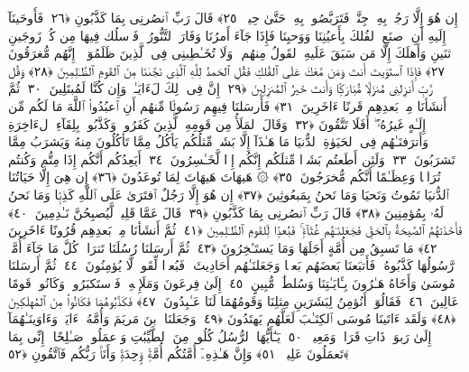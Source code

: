  إِن هُوَ إِلَّا رَجُلٌۢ بِهِۦ جِنَّةٌۭ فَتَرَبَّصُوا۟ بِهِۦ حَتَّىٰ حِينٍۢ ﴿٢٥﴾
 قَالَ رَبِّ ٱنصُرنِى بِمَا كَذَّبُونِ ﴿٢٦﴾
 فَأَوحَينَآ إِلَيهِ أَنِ ٱصنَعِ ٱلفُلكَ بِأَعيُنِنَا وَوَحيِنَا فَإِذَا جَآءَ أَمرُنَا وَفَارَ ٱلتَّنُّورُ ۙ فَٱسلُك فِيهَا مِن كُلٍّۢ زَوجَينِ ٱثنَينِ وَأَهلَكَ إِلَّا مَن سَبَقَ عَلَيهِ ٱلقَولُ مِنهُم ۖ وَلَا تُخَـٰطِبنِى فِى ٱلَّذِينَ ظَلَمُوٓا۟ ۖ إِنَّهُم مُّغرَقُونَ ﴿٢٧﴾
 فَإِذَا ٱستَوَيتَ أَنتَ وَمَن مَّعَكَ عَلَى ٱلفُلكِ فَقُلِ ٱلحَمدُ لِلَّهِ ٱلَّذِى نَجَّىٰنَا مِنَ ٱلقَومِ ٱلظَّـٰلِمِينَ ﴿٢٨﴾
 وَقُل رَّبِّ أَنزِلنِى مُنزَلًۭا مُّبَارَكًۭا وَأَنتَ خَيرُ ٱلمُنزِلِينَ ﴿٢٩﴾
 إِنَّ فِى ذَٟلِكَ لَءَايَـٰتٍۢ وَإِن كُنَّا لَمُبتَلِينَ ﴿٣٠﴾
 ثُمَّ أَنشَأنَا مِنۢ بَعدِهِم قَرنًا ءَاخَرِينَ ﴿٣١﴾
 فَأَرسَلنَا فِيهِم رَسُولًۭا مِّنهُم أَنِ ٱعبُدُوا۟ ٱللَّهَ مَا لَكُم مِّن إِلَـٰهٍ غَيرُهُۥٓ ۖ أَفَلَا تَتَّقُونَ ﴿٣٢﴾
 وَقَالَ ٱلمَلَأُ مِن قَومِهِ ٱلَّذِينَ كَفَرُوا۟ وَكَذَّبُوا۟ بِلِقَآءِ ٱلءَاخِرَةِ وَأَترَفنَـٰهُم فِى ٱلحَيَوٰةِ ٱلدُّنيَا مَا هَـٰذَآ إِلَّا بَشَرٌۭ مِّثلُكُم يَأكُلُ مِمَّا تَأكُلُونَ مِنهُ وَيَشرَبُ مِمَّا تَشرَبُونَ ﴿٣٣﴾
 وَلَئِن أَطَعتُم بَشَرًۭا مِّثلَكُم إِنَّكُم إِذًۭا لَّخَـٰسِرُونَ ﴿٣٤﴾
 أَيَعِدُكُم أَنَّكُم إِذَا مِتُّم وَكُنتُم تُرَابًۭا وَعِظَـٰمًا أَنَّكُم مُّخرَجُونَ ﴿٣٥﴾
 ۞ هَيهَاتَ هَيهَاتَ لِمَا تُوعَدُونَ ﴿٣٦﴾
 إِن هِىَ إِلَّا حَيَاتُنَا ٱلدُّنيَا نَمُوتُ وَنَحيَا وَمَا نَحنُ بِمَبعُوثِينَ ﴿٣٧﴾
 إِن هُوَ إِلَّا رَجُلٌ ٱفتَرَىٰ عَلَى ٱللَّهِ كَذِبًۭا وَمَا نَحنُ لَهُۥ بِمُؤمِنِينَ ﴿٣٨﴾
 قَالَ رَبِّ ٱنصُرنِى بِمَا كَذَّبُونِ ﴿٣٩﴾
 قَالَ عَمَّا قَلِيلٍۢ لَّيُصبِحُنَّ نَـٰدِمِينَ ﴿٤٠﴾
 فَأَخَذَتهُمُ ٱلصَّيحَةُ بِٱلحَقِّ فَجَعَلنَـٰهُم غُثَآءًۭ ۚ فَبُعدًۭا لِّلقَومِ ٱلظَّـٰلِمِينَ ﴿٤١﴾
 ثُمَّ أَنشَأنَا مِنۢ بَعدِهِم قُرُونًا ءَاخَرِينَ ﴿٤٢﴾
 مَا تَسبِقُ مِن أُمَّةٍ أَجَلَهَا وَمَا يَستَـٔخِرُونَ ﴿٤٣﴾
 ثُمَّ أَرسَلنَا رُسُلَنَا تَترَا ۖ كُلَّ مَا جَآءَ أُمَّةًۭ رَّسُولُهَا كَذَّبُوهُ ۚ فَأَتبَعنَا بَعضَهُم بَعضًۭا وَجَعَلنَـٰهُم أَحَادِيثَ ۚ فَبُعدًۭا لِّقَومٍۢ لَّا يُؤمِنُونَ ﴿٤٤﴾
 ثُمَّ أَرسَلنَا مُوسَىٰ وَأَخَاهُ هَـٰرُونَ بِـَٔايَـٰتِنَا وَسُلطَٰنٍۢ مُّبِينٍ ﴿٤٥﴾
 إِلَىٰ فِرعَونَ وَمَلَإِي۟هِۦ فَٱستَكبَرُوا۟ وَكَانُوا۟ قَومًا عَالِينَ ﴿٤٦﴾
 فَقَالُوٓا۟ أَنُؤمِنُ لِبَشَرَينِ مِثلِنَا وَقَومُهُمَا لَنَا عَـٰبِدُونَ ﴿٤٧﴾
 فَكَذَّبُوهُمَا فَكَانُوا۟ مِنَ ٱلمُهلَكِينَ ﴿٤٨﴾
 وَلَقَد ءَاتَينَا مُوسَى ٱلكِتَـٰبَ لَعَلَّهُم يَهتَدُونَ ﴿٤٩﴾
 وَجَعَلنَا ٱبنَ مَريَمَ وَأُمَّهُۥٓ ءَايَةًۭ وَءَاوَينَـٰهُمَآ إِلَىٰ رَبوَةٍۢ ذَاتِ قَرَارٍۢ وَمَعِينٍۢ ﴿٥٠﴾
 يَـٰٓأَيُّهَا ٱلرُّسُلُ كُلُوا۟ مِنَ ٱلطَّيِّبَٰتِ وَٱعمَلُوا۟ صَـٰلِحًا ۖ إِنِّى بِمَا تَعمَلُونَ عَلِيمٌۭ ﴿٥١﴾
 وَإِنَّ هَـٰذِهِۦٓ أُمَّتُكُم أُمَّةًۭ وَٟحِدَةًۭ وَأَنَا۠ رَبُّكُم فَٱتَّقُونِ ﴿٥٢﴾
